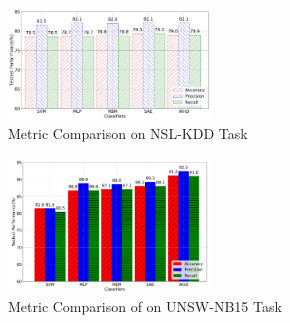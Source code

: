 \begin{figure}[h]
    \centering
    \includegraphics[width=0.48\textwidth]{figures/comp_accuracy_nsl.pdf}
    \caption{Metric Comparison on NSL-KDD Task}
    \label{Fig:CompAccuracyNSL}
\end{figure}

\begin{figure}[h]
    \centering
    \includegraphics[width=0.48\textwidth]{figures/comp_accuracy_unsw.pdf}
    \caption{Metric Comparison of on UNSW-NB15 Task}
    \label{Fig:CompAccuracyUNSW}
\end{figure}

